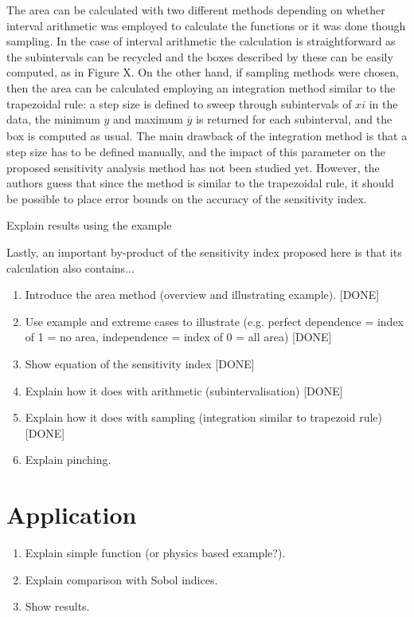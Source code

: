 \documentclass[twocolumn]{rps-esrel2022}
\begin{document}
The area can be calculated with two different methods depending on whether interval arithmetic was employed to calculate the functions or it was done though sampling.
In the case of interval arithmetic the calculation is straightforward as the subintervals can be recycled and the boxes described by these can be easily computed, as in Figure X.
On the other hand, if sampling methods were chosen, then the area can be calculated employing an integration method similar to the trapezoidal rule: a step size is defined to
sweep through subintervals of $xi$ in the data, the minimum $\underline{y}$ and maximum $\overline{y}$ is returned for each subinterval, and the box is computed as usual.
The main drawback of the integration method is that a step size has to be defined manually, and the impact of this parameter on the proposed sensitivity analysis method has not
been studied yet.
However, the authors guess that since the method is similar to the trapezoidal rule, it should be possible to place error bounds on the accuracy of the sensitivity index.


Explain results using the example

Lastly, an important by-product of the sensitivity index proposed here is that its calculation also contains...
\begin{enumerate}
	\item Introduce the area method (overview and illustrating example). [DONE]
	\item Use example and extreme cases to illustrate (e.g. perfect dependence = index of 1 = no area, independence = index of 0 = all area) [DONE]
	\item Show equation of the sensitivity index [DONE]
	\item Explain how it does with arithmetic (subintervalisation) [DONE]
	\item Explain how it does with sampling (integration similar to trapezoid rule) [DONE]
	\item Explain pinching.
\end{enumerate}

\section{Application}

\begin{enumerate}
	\item Explain simple function (or physics based example?).
	\item Explain comparison with Sobol indices.
	\item Show results.
\end{enumerate}
\end{document}
